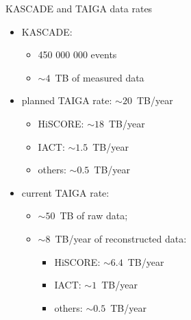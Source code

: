 \begin{frame}{KASCADE and TAIGA data rates}
\begin{minipage}[c]{0.5\textwidth}
  \begin{itemize}
    \item KASCADE:
    \begin{itemize}
      \item 450 000 000 events
      \item $\sim 4$~TB of measured data
    \end{itemize}
    \vspace{2em}
    \item planned TAIGA rate: $\sim 20$~TB/year
    \begin{itemize}
      \item HiSCORE: $\sim 18$~TB/year
      \item IACT: $\sim 1.5$~TB/year
      \item others: $\sim 0.5$~TB/year
    \end{itemize}
  \end{itemize}
\end{minipage}
\hfill
\begin{minipage}[c]{0.49\textwidth}
\vspace{-3.5em}
  \begin{itemize}
    \item current TAIGA rate: 
    \begin{itemize}
      \item $\sim 50$~TB of raw data;
      \item $\sim 8$~TB/year of reconstructed data:
      \begin{itemize}
        \item HiSCORE: $\sim 6.4$~TB/year
        \item IACT: $\sim 1$~TB/year
        \item others: $\sim 0.5$~TB/year
      \end{itemize}
    \end{itemize}
  \end{itemize}
\end{minipage}
\end{frame}
% 
